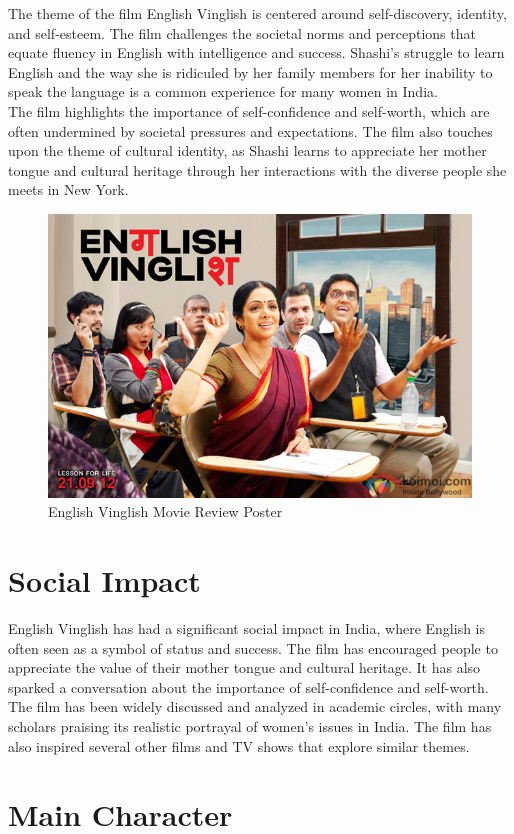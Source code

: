 \documentclass[11pt]{article}
\begin{document}
The theme of the film English Vinglish is centered around self-discovery, identity, and self-esteem. The film challenges the societal norms and perceptions that equate fluency in English with intelligence and success. Shashi's struggle to learn English and the way she is ridiculed by her family members for her inability to speak the language is a common experience for many women in India.\\

The film highlights the importance of self-confidence and self-worth, which are often undermined by societal pressures and expectations. The film also touches upon the theme of cultural identity, as Shashi learns to appreciate her mother tongue and cultural heritage through her interactions with the diverse people she meets in New York.

\begin{figure}[H]
    \centering
    \includegraphics[width=.45\textwidth]{English-Vinglish-Movie-Review.jpg}
    \caption{English Vinglish Movie Review Poster}
\end{figure}


\section{Social Impact}

English Vinglish has had a significant social impact in India, where English is often seen as a symbol of status and success. The film has encouraged people to appreciate the value of their mother tongue and cultural heritage. It has also sparked a conversation about the importance of self-confidence and self-worth.\\

The film has been widely discussed and analyzed in academic circles, with many scholars praising its realistic portrayal of women's issues in India. The film has also inspired several other films and TV shows that explore similar themes.


\section{Main Character}
\end{document}
